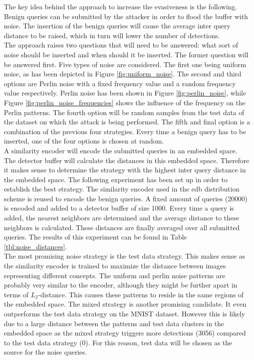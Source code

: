 The key idea behind the approach to increase the evasiveness is the following. Benign queries can be submitted by the attacker in order to flood the buffer with noise. The insertion of the benign queries will cause the average inter query distance to be raised, which in turn will lower the number of detections.\\

The approach raises two questions that will need to be answered: what sort of noise should be inserted and when should it be inserted. The former question will be answered first. Five types of noise are considered. The first one being uniform noise, as has been depicted in Figure \ref{fig:uniform_noise}. The second and third options are Perlin noise with a fixed frequency value and a random frequency value respectively. Perlin noise has been shown in Figure \ref{fig:perlin_noise}, while Figure \ref{fig:perlin_noise_frequencies} shows the influence of the frequency on the Perlin patterns. The fourth option will be random samples from the test data of the dataset on which the attack is being performed. The fifth and final option is a combination of the previous four strategies. Every time a benign query has to be inserted, one of the four options is chosen at random.\\

A similarity encoder will encode the submitted queries in an embedded space. The detector buffer will calculate the distances in this embedded space. Therefore it makes sense to determine the strategy with the highest inter query distance in the embedded space. The following experiment has been set up in order to establish the best strategy. The similarity encoder used in the \gls{edb} distribution scheme is reused to encode the benign queries. A fixed amount of queries (\num{20000}) is encoded and added to a detector buffer of size \num{1000}. Every time a query is added, the nearest neighbors are determined and the average distance to these neighbors is calculated. These distances are finally averaged over all submitted queries. The results of this experiment can be found in Table \ref{tbl:noise_distances}.\\

The most promising noise strategy is the test data strategy. This makes sense as the similarity encoder is trained to maximize the distance between images representing different concepts. The uniform and perlin noise patterns are probably very similar to the encoder, although they might be further apart in terms of $L_2$-distance. This causes these patterns to reside in the same regions of the embedded space. The mixed strategy is another promising candidate. It even outperforms the test data strategy on the MNIST dataset. However this is likely due to a large distance between the patterns and test data clusters in the embedded space as the mixed strategy triggers more detections (3056) compared to the test data strategy (0). For this reason, test data will be chosen as the source for the noise queries.\\

